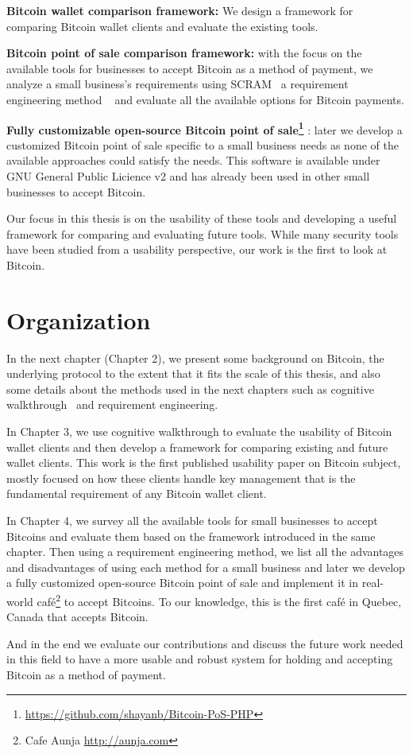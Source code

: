 \textbf{Bitcoin wallet comparison framework:} We design a framework for comparing Bitcoin wallet clients and evaluate the existing tools.

\textbf{Bitcoin point of sale comparison framework: } with the focus on the available tools for businesses to accept Bitcoin as a method of payment, we analyze a small business's requirements using SCRAM~\cite{REScenario} a requirement engineering method ~\cite{dorfman1990system} and evaluate all the available options for Bitcoin payments.

\textbf{Fully customizable open-source Bitcoin point of sale\footnote{\url{https://github.com/shayanb/Bitcoin-PoS-PHP}} }: later we develop a customized Bitcoin point of sale specific to a small business needs as none of the available approaches could satisfy the needs. This software is available under GNU General Public Licience v2 and has already been used in other small businesses to accept Bitcoin.

Our focus in this thesis is on the usability of these tools and developing a useful framework for comparing and evaluating future tools. While many security tools have been studied from a usability perspective, our work is the first to look at Bitcoin. 

\section{Organization}
In the next chapter (Chapter 2), we present some background on Bitcoin, the underlying protocol to the extent that it fits the scale of this thesis, and also some details about the methods used in the next chapters such as cognitive walkthrough~\cite{WRLP94}  and requirement engineering.

In Chapter 3, we use cognitive walkthrough to evaluate the usability of Bitcoin wallet clients and then develop a framework for comparing existing and future wallet clients. This work is the first published usability paper on Bitcoin subject, mostly focused on how these clients handle key management that is the fundamental requirement of any Bitcoin wallet client.

In Chapter 4, we survey all the available tools for small businesses to accept Bitcoins and evaluate them based on the framework introduced in the same chapter. Then using a requirement engineering method, we list all the advantages and disadvantages of using each method for a small business and later we develop a fully customized open-source Bitcoin point of sale and implement it in real-world café\footnote{ Cafe Aunja \url{http://aunja.com}} to accept Bitcoins. To our knowledge, this is the first café in Quebec, Canada that accepts Bitcoin.

And in the end we evaluate our contributions and discuss the future work needed in this field to have a more usable and robust system for holding and accepting Bitcoin as a method of payment.